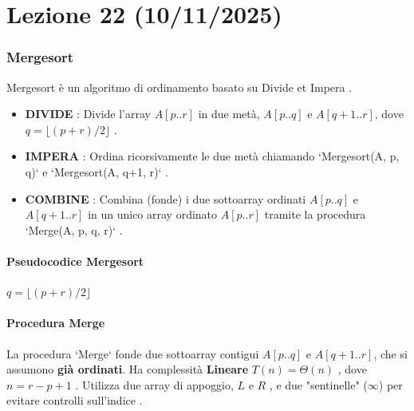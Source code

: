 
\part{Lezione 22 (10/11/2025) }

\section{Mergesort }
Mergesort è un algoritmo di ordinamento basato su Divide et Impera .

\begin{definition}
\begin{itemize}
    \item \textbf{DIVIDE} : Divide l'array $A[p..r]$ in due metà, $A[p..q]$ e $A[q+1..r]$, dove $q = \lfloor (p+r)/2 \rfloor$ .
    \item \textbf{IMPERA} : Ordina ricorsivamente le due metà chiamando `Mergesort(A, p, q)` e `Mergesort(A, q+1, r)` .
    \item \textbf{COMBINE} : Combina (fonde) i due sottoarray ordinati $A[p..q]$ e $A[q+1..r]$ in un unico array ordinato $A[p..r]$ tramite la procedura `Merge(A, p, q, r)` .
\end{itemize}
\end{definition}

\subsection{Pseudocodice Mergesort}
\begin{algorithmic}[1]
        \State $q = \lfloor (p+r)/2 \rfloor$ 
        \State {} 
        \State {} 
        \State {} 
    \EndIf
\EndProcedure
\end{algorithmic}

\subsection{Procedura Merge }

\begin{observation}
La procedura `Merge` fonde due sottoarray contigui $A[p..q]$ e $A[q+1..r]$, che si assumono \textbf{già ordinati}.
Ha complessità \textbf{Lineare} $T(n) = \Theta(n)$ , dove $n = r-p+1$ .
Utilizza due array di appoggio, $L$ e $R$ , e due "sentinelle" ($\infty$) per evitare controlli sull'indice .
\end{observation}

